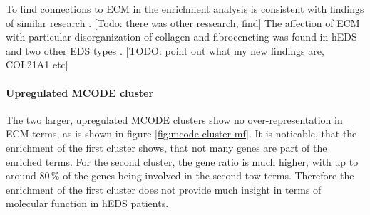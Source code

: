 To find connections to ECM in the enrichment analysis is consistent with findings of similar research \cite{Ritelli2022}. [Todo: there was other ressearch, find] The affection of ECM with particular disorganization of collagen and fibrocencting was found in hEDS and two other EDS types \cite{Chiarelli2018}. [TODO: point out what my new findings are, COL21A1 etc]

\paragraph{Upregulated MCODE cluster}

The two larger, upregulated MCODE clusters show no over-representation in ECM-terms, as is shown in figure \ref{fig:mcode-cluster-mf}. It is noticable, that the enrichment of the first cluster shows, that not many genes are part of the enriched terms. For the second cluster, the gene ratio is much higher, with up to around 80\,\% of the genes being involved in the second tow terms. Therefore the enrichment of the first cluster does not provide much insight in terms of molecular function in hEDS patients.

